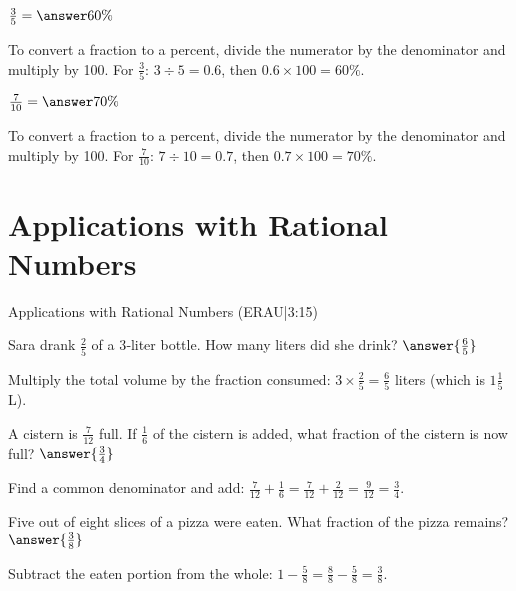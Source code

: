 \documentclass{ximera}
\begin{document}
\begin{problem}
$\frac{3}{5} = \answer{60\%}$

\begin{feedback}
To convert a fraction to a percent, divide the numerator by the denominator and multiply by 100. For $\frac{3}{5}$: $3 \div 5 = 0.6$, then $0.6 \times 100 = 60\%$.
\end{feedback}

\end{problem}

\begin{problem}
$\frac{7}{10} = \answer{70\%}$

\begin{feedback}
To convert a fraction to a percent, divide the numerator by the denominator and multiply by 100. For $\frac{7}{10}$: $7 \div 10 = 0.7$, then $0.7 \times 100 = 70\%$.
\end{feedback}

\end{problem}


\section*{Applications with Rational Numbers} 

Applications with Rational Numbers (ERAU|3:15)


\begin{problem}
Sara drank \(\frac{2}{5}\) of a 3‑liter bottle. How many liters did she drink? \(\answer{\frac{6}{5}}\)
\begin{feedback}
Multiply the total volume by the fraction consumed: \(3\times\frac{2}{5}=\frac{6}{5}\) liters (which is \(1\frac{1}{5}\) L).
\end{feedback}
\end{problem}

\begin{problem}
A cistern is \(\frac{7}{12}\) full. If \(\frac{1}{6}\) of the cistern is added, what fraction of the cistern is now full? \(\answer{\frac{3}{4}}\)
\begin{feedback}
Find a common denominator and add: \(\frac{7}{12}+\frac{1}{6}=\frac{7}{12}+\frac{2}{12}=\frac{9}{12}=\frac{3}{4}\).
\end{feedback}
\end{problem}

\begin{problem}
Five out of eight slices of a pizza were eaten. What fraction of the pizza remains? \(\answer{\frac{3}{8}}\)
\begin{feedback}
Subtract the eaten portion from the whole: \(1-\frac{5}{8}=\frac{8}{8}-\frac{5}{8}=\frac{3}{8}\).
\end{feedback}
\end{problem}
\end{document}
